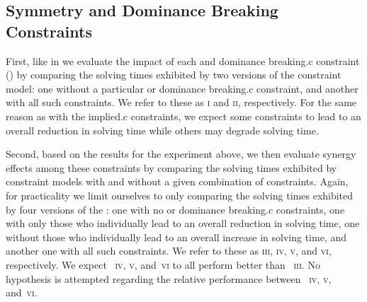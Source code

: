 \subsection{Symmetry and Dominance Breaking Constraints}

\def\modelA{\textsc{i}}
\def\modelB{\textsc{ii}}

First, like in  we evaluate
the impact of each  and \gls{dominance breaking.c}
\gls{constraint}
() by comparing the solving times exhibited by two versions of the
\gls{constraint model}: one without a particular 
or \gls{dominance breaking.c} \gls{constraint}, and another with all such
\glspl{constraint}.
%
We refer to these  as \modelA{} and \modelB,
respectively.
%
For the same reason as with the \gls{implied.c} \glspl{constraint}, we expect
some \glspl{constraint} to lead to an overall reduction in solving time while
others may degrade solving time.

\def\modelC{\textsc{iii}}
\def\modelD{\textsc{iv}}
\def\modelE{\textsc{v}}
\def\modelF{\textsc{vi}}

Second, based on the results for the experiment above, we then evaluate synergy
effects among these \glspl{constraint} by comparing the solving times exhibited
by \glspl{constraint model} with and without a given combination of
\glspl{constraint}.
%
Again, for practicality we limit ourselves to only comparing the solving times
exhibited by four versions of the : one with no
 or \gls{dominance breaking.c} \glspl{constraint},
one with only those who individually lead to an overall reduction in solving
time, one without those who individually lead to an overall increase in solving
time, and another one with all such \glspl{constraint}.
%
We refer to these  as \modelC, \modelD, \modelE,
and \modelF, respectively.
%
We expect ~\modelD, \modelE, and~\modelF{} to all
perform better than ~\modelC.
%
No hypothesis is attempted regarding the relative performance between
~\modelD, \modelE, and~\modelF.


